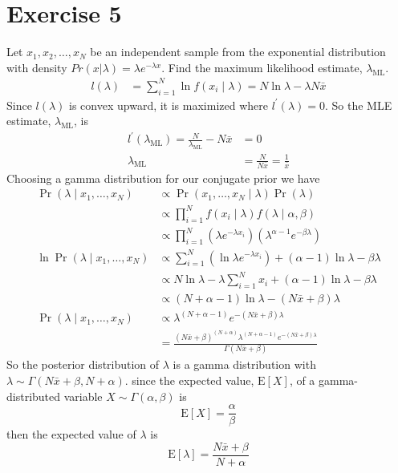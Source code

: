 \documentclass[letterpaper]{amsart}
\begin{document}
\section*{Exercise 5}
Let
\(x_1,x_2,\dots,x_N\)
be an independent sample from the exponential distribution with density
\(
Pr(x|\lambda) = \lambda e^{-\lambda x}
\).
Find the maximum likelihood estimate,
\(\lambda_\text{ML}\).
\begin{align*}
  l(\lambda)
  &= \sum_{i=1}^N\ln f(x_i \mid \lambda)
    = N\ln\lambda - \lambda N\bar{x}
\end{align*}
Since
$l(\lambda)$
is convex upward, it is maximized where
$l^\prime(\lambda) = 0$.
So the MLE estimate,
\(\lambda_{\text{ML}}\),
is
\begin{align*}
  l^\prime
  (\lambda_{\text{ML}})
  = \frac{N}{\lambda_{\text{ML}}} - N\bar{x}
  &=0
    \\
  \lambda_{\text{ML}}
  &= \frac
  {N}
  {N\bar{x}}
  = \frac
  {1}
  {\bar{x}}
\end{align*}
Choosing a gamma distribution for our conjugate prior we have
\begin{align*}
  \Pr(\lambda\mid x_1,\dots, x_N)
  &\propto
    \Pr(x_1,\dots, x_N\mid\lambda)\Pr(\lambda)
    \\
  &\propto
    \prod_{i=1}^Nf(x_i\mid\lambda)f(\lambda\mid\alpha,\beta)
    \\
  &\propto
    \prod_{i=1}^N\left(\lambda e^{-\lambda x_i}\right)
    \left( \lambda^{\alpha-1} e^{-\beta\lambda} \right)
    \\
  \ln\Pr(\lambda\mid x_1,\dots, x_N)
  &\propto
   \sum_{i=1}^N \left( \ln \lambda e^{-\lambda x_i} \right)
    + (\alpha - 1)\ln\lambda-\beta\lambda
    \\
  &\propto
    N\ln\lambda - \lambda \sum_{i=1}^N x_i
    + (\alpha - 1)\ln\lambda-\beta\lambda
    \\
  &\propto
    \left(
    N+\alpha-1
    \right)
    \ln\lambda
    -(N\bar{x} + \beta)\lambda
    \\
  \Pr(\lambda\mid x_1,\dots, x_N)
  &\propto
    \lambda^{
    \left(
    N+\alpha-1
    \right)
    }
    e^{
    -(N\bar{x}+ \beta)\lambda
    }
    \\
  &=
    \frac{
    (N\bar{x}+\beta)^{(N+\alpha)}
    \lambda^{(N+\alpha-1)}
    e^{-(N\bar{x} + \beta)\lambda}
    }
    {
    \Gamma\left(
    N\bar{x}+\beta
    \right)
    }
\end{align*}
So the posterior distribution of \(\lambda\) is a gamma distribution with
\(\lambda\sim\Gamma(N\bar{x}+\beta, N+\alpha)\).
since the expected value, \(\text{E}\left[X\right]\),
of a gamma-distributed variable \(X\sim\Gamma(\alpha,\beta)\) is
\begin{equation*}
  \text{E}\left[X\right]
  =
  \frac{\alpha}{\beta}
\end{equation*}
then the expected value of \(\lambda\) is
\begin{equation*}
  \text{E}\left[\lambda\right]
  =
  \frac
  {N\bar{x}+\beta}
  {N+\alpha}
\end{equation*}
\end{document}
